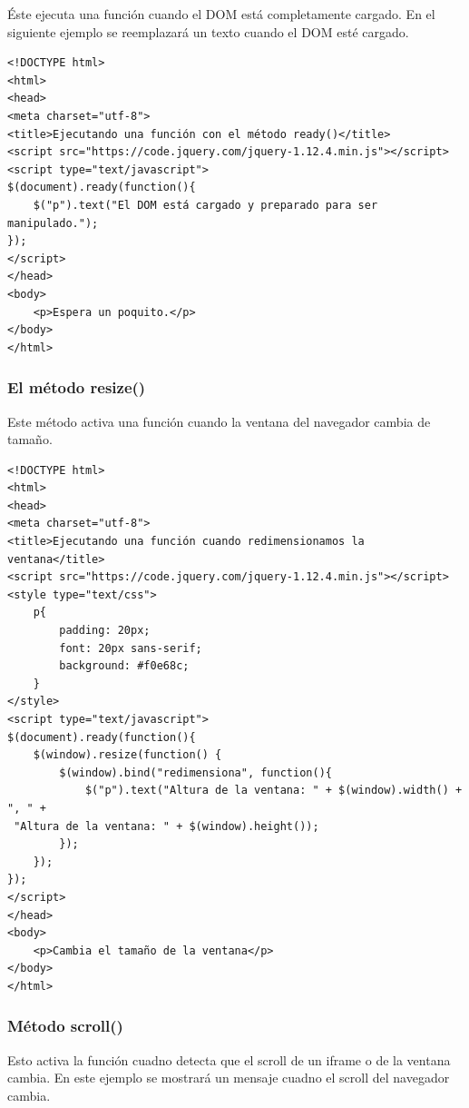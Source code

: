\documentclass[a4paper, oneside]{article}
\begin{document}
Éste ejecuta una función cuando el DOM está completamente cargado. En el siguiente ejemplo se reemplazará un texto cuando el DOM esté cargado.

\begin{verbatim}
<!DOCTYPE html>
<html>
<head>
<meta charset="utf-8">
<title>Ejecutando una función con el método ready()</title>
<script src="https://code.jquery.com/jquery-1.12.4.min.js"></script>
<script type="text/javascript">
$(document).ready(function(){
    $("p").text("El DOM está cargado y preparado para ser manipulado.");
});
</script>
</head>
<body>
    <p>Espera un poquito.</p>
</body>
</html>                                		
\end{verbatim}

\subsubsection{El método resize()}
\label{sec:org64a094e}

Este método activa una función cuando la ventana del navegador cambia de tamaño.

\begin{verbatim}
<!DOCTYPE html>
<html>
<head>
<meta charset="utf-8">
<title>Ejecutando una función cuando redimensionamos la ventana</title>
<script src="https://code.jquery.com/jquery-1.12.4.min.js"></script>
<style type="text/css">
    p{
        padding: 20px;
        font: 20px sans-serif;
        background: #f0e68c;
    }
</style>
<script type="text/javascript">
$(document).ready(function(){
    $(window).resize(function() {
        $(window).bind("redimensiona", function(){ 
            $("p").text("Altura de la ventana: " + $(window).width() + ", " +
 "Altura de la ventana: " + $(window).height());
        });
    });
});
</script>
</head> 
<body>
    <p>Cambia el tamaño de la ventana</p>
</body>
</html>     
\end{verbatim}

\subsubsection{Método scroll()}
\label{sec:org4cc6332}

Esto activa la función cuadno detecta que el scroll de un iframe o de la ventana cambia. En este ejemplo se mostrará un mensaje cuadno el scroll del navegador cambia.
\end{document}
